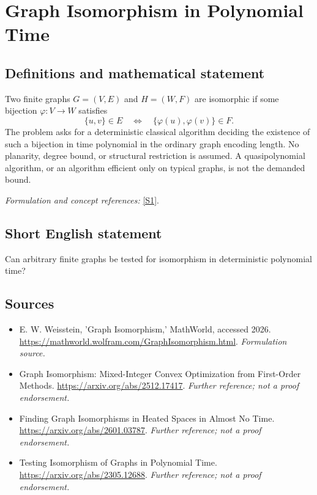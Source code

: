 \documentclass[11pt]{article}
\begin{document}
\section*{\texorpdfstring{Graph Isomorphism in Polynomial Time}{Graph Isomorphism in Polynomial Time}}\label{30006715}
\subsection{Definitions and mathematical statement}
Two finite graphs $G=(V,E)$ and $H=(W,F)$ are isomorphic if some bijection $\varphi:V\to W$ satisfies
\[
 \{u,v\}\in E\quad\Longleftrightarrow\quad\{\varphi(u),\varphi(v)\}\in F.
\]
The problem asks for a deterministic classical algorithm deciding the existence of such a bijection in time polynomial in the ordinary graph encoding length. No planarity, degree bound, or structural restriction is assumed. A quasipolynomial algorithm, or an algorithm efficient only on typical graphs, is not the demanded bound.
\par\smallskip\textit{Formulation and concept references:} \href{https://mathworld.wolfram.com/GraphIsomorphism.html}{[S1]}.

\subsection{Short English statement}
Can arbitrary finite graphs be tested for isomorphism in deterministic polynomial time?
\subsection{Sources}
\begin{itemize}
\item[S1]E. W. Weisstein, 'Graph Isomorphism,' MathWorld, accessed 2026.
\url{https://mathworld.wolfram.com/GraphIsomorphism.html}.
\textit{Formulation source.}
\item[S2]Graph Isomorphism: Mixed-Integer Convex Optimization from First-Order Methods.
\url{https://arxiv.org/abs/2512.17417}.
\textit{Further reference; not a proof endorsement.}
\item[S3]Finding Graph Isomorphisms in Heated Spaces in Almost No Time.
\url{https://arxiv.org/abs/2601.03787}.
\textit{Further reference; not a proof endorsement.}
\item[S4]Testing Isomorphism of Graphs in Polynomial Time.
\url{https://arxiv.org/abs/2305.12688}.
\textit{Further reference; not a proof endorsement.}
\end{itemize}
\end{document}
